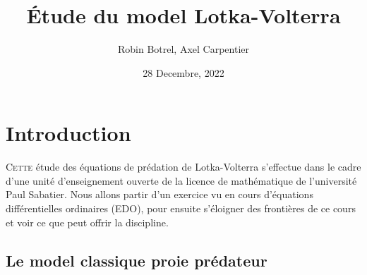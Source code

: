 \documentclass{wsdcr}
\title{Étude du model Lotka-Volterra}
\author{Robin Botrel, Axel Carpentier}
\affil{\textit{Université Paul Sabatier}\\
\textit{Toulouse, France}}
\date{28 Decembre, 2022}
\begin{document}
\maketitle
\tableofcontents
\section{Introduction}

\lettrine{C}{ette} étude des équations de prédation de Lotka-Volterra s'effectue dans le cadre d'une unité d'enseignement ouverte de la licence de mathématique de l'université Paul Sabatier. Nous allons partir d'un exercice vu en cours d'équations différentielles ordinaires (EDO), pour ensuite s'éloigner des frontières de ce cours et voir ce que peut offrir la discipline.



\subsection{Le model classique proie prédateur}
\end{document}
